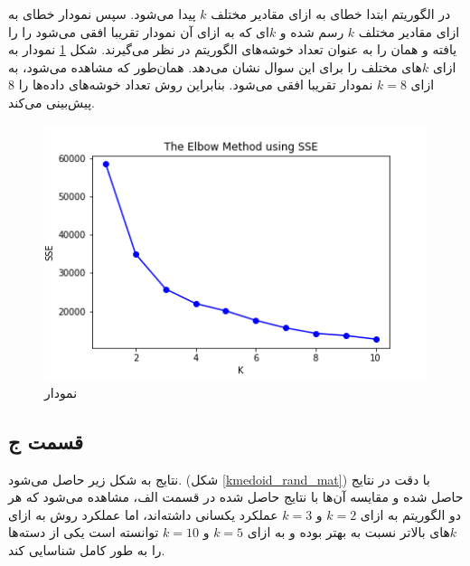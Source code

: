 \documentclass[12pt, a4paper]{article}
\begin{document}
در الگوریتم  ابتدا خطای  به ازای مقادیر مختلف $k$ پیدا می‌شود. سپس نمودار خطای
 به ازای مقادیر مختلف $k$ رسم شده و $k$ای که به ازای آن نمودار  تقریبا افقی می‌شود را
را یافته و همان را به عنوان تعداد خوشه‌های الگوریتم در نظر می‌گیرند. شکل \ref{elbow} نمودار  به ازای
$k$های مختلف را برای این سوال نشان می‌دهد. همان‌طور که مشاهده می‌شود، به ازای $k=8$ نمودار تقریبا افقی می‌شود.
بنابراین روش  تعداد خوشه‌های داده‌ها را $8$ پیش‌بینی می‌کند.

\newpage

\begin{figure}[t]
    \centering
    \includegraphics[scale=0.5]{images/q3/b/elbow.png}
    \caption{نمودار }
    \label{elbow}
\end{figure}

\subsection*{قسمت ج}

نتایج به شکل زیر حاصل می‌شود. (شکل \ref{kmedoid_rand_mat})
با دقت در نتایج حاصل شده و مقایسه آن‌ها با نتایج حاصل شده در قسمت الف، مشاهده می‌شود که
هر دو الگوریتم به ازای $k=2$ و $k=3$ عملکرد یکسانی داشته‌اند، اما عملکرد روش 
به ازای $k$های بالاتر نسبت به  بهتر بوده و به ازای $k=5$ و $k=10$ توانسته است
یکی از دسته‌ها را به طور کامل شناسایی کند.
\end{document}
